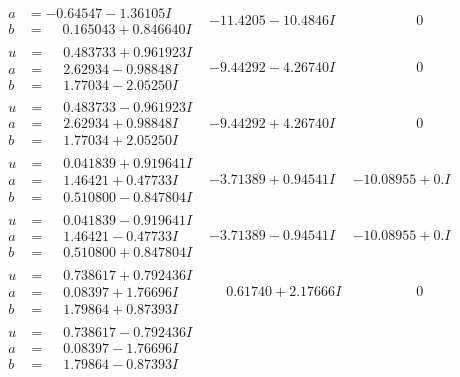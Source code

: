 \documentclass[1p]{elsarticle_modified}
\theoremstyle{definition}
\begin{document}
$$\begin{array}{c|c|c}
\begin{aligned}
a &= -0.64547 - 1.36105 I \\
b &= \phantom{-}0.165043 + 0.846640 I\end{aligned}
 & -11.4205 - 10.4846 I & \phantom{-0.000000 } 0 \\ \hline\begin{aligned}
u &= \phantom{-}0.483733 + 0.961923 I \\
a &= \phantom{-}2.62934 - 0.98848 I \\
b &= \phantom{-}1.77034 - 2.05250 I\end{aligned}
 & -9.44292 - 4.26740 I & \phantom{-0.000000 } 0 \\ \hline\begin{aligned}
u &= \phantom{-}0.483733 - 0.961923 I \\
a &= \phantom{-}2.62934 + 0.98848 I \\
b &= \phantom{-}1.77034 + 2.05250 I\end{aligned}
 & -9.44292 + 4.26740 I & \phantom{-0.000000 } 0 \\ \hline\begin{aligned}
u &= \phantom{-}0.041839 + 0.919641 I \\
a &= \phantom{-}1.46421 + 0.47733 I \\
b &= \phantom{-}0.510800 - 0.847804 I\end{aligned}
 & -3.71389 + 0.94541 I & -10.08955 + 0. I\phantom{ +0.000000I} \\ \hline\begin{aligned}
u &= \phantom{-}0.041839 - 0.919641 I \\
a &= \phantom{-}1.46421 - 0.47733 I \\
b &= \phantom{-}0.510800 + 0.847804 I\end{aligned}
 & -3.71389 - 0.94541 I & -10.08955 + 0. I\phantom{ +0.000000I} \\ \hline\begin{aligned}
u &= \phantom{-}0.738617 + 0.792436 I \\
a &= \phantom{-}0.08397 + 1.76696 I \\
b &= \phantom{-}1.79864 + 0.87393 I\end{aligned}
 & \phantom{-}0.61740 + 2.17666 I & \phantom{-0.000000 } 0 \\ \hline\begin{aligned}
u &= \phantom{-}0.738617 - 0.792436 I \\
a &= \phantom{-}0.08397 - 1.76696 I \\
b &= \phantom{-}1.79864 - 0.87393 I\end{aligned}

\end{array}$$
\end{document}

